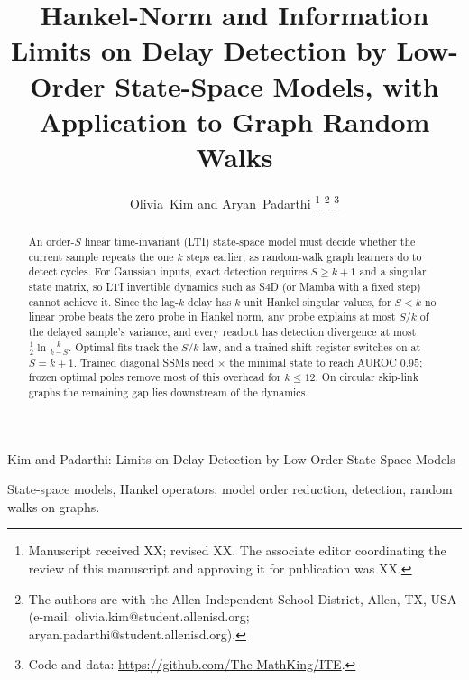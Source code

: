 \documentclass[journal]{IEEEtran}
\theoremstyle{remark}
\begin{document}
\title{Hankel-Norm and Information Limits on Delay Detection by Low-Order
State-Space Models, with Application to Graph Random Walks}

\author{Olivia~Kim and Aryan~Padarthi%
\thanks{Manuscript received XX; revised XX. The associate editor coordinating the review of this manuscript and approving it for publication was XX.}%
\thanks{The authors are with the Allen Independent School District, Allen, TX, USA (e-mail: olivia.kim@student.allenisd.org; aryan.padarthi@student.allenisd.org).}%
\thanks{Code and data: \url{https://github.com/The-MathKing/ITE}.}}

%
{Kim and Padarthi: Limits on Delay Detection by Low-Order State-Space Models}

\maketitle

\begin{abstract}
An order-$S$ linear time-invariant (LTI) state-space model must decide
whether the current sample repeats the one $k$ steps earlier, as random-walk
graph learners do to detect cycles. For Gaussian inputs, exact detection
requires $S\ge k+1$ and a singular state matrix, so LTI invertible dynamics
such as S4D (or Mamba with a fixed step) cannot achieve it. Since the lag-$k$ delay has $k$ unit
Hankel singular values, for $S<k$ no linear probe beats the zero probe in
Hankel norm, any probe explains at most $S/k$ of the delayed sample's
variance, and every readout has detection divergence at most
$\tfrac12\ln\frac{k}{k-S}$. Optimal fits track the $S/k$ law, and a trained
shift register switches on at $S=k+1$. Trained diagonal SSMs need
\ratioLTIc$\times$ the minimal state to reach AUROC $0.95$; frozen optimal
poles remove most of this overhead for $k\le12$. On circular skip-link
graphs the remaining gap lies downstream of the dynamics.
\end{abstract}

\begin{IEEEkeywords}
State-space models, Hankel operators, model order reduction, detection, random walks on graphs.
\end{IEEEkeywords}
\end{document}
